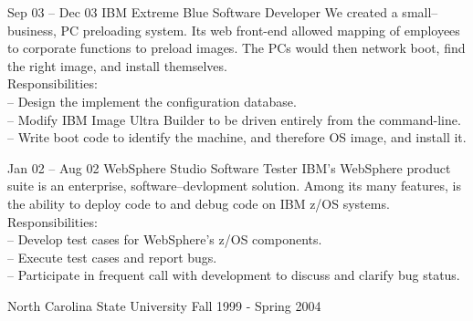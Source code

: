 \documentclass[a4paper, 10pt]{article}
\begin{document}
\begin{resume}
\begin{project}{Sep 03 -- Dec 03} {IBM Extreme Blue} {Software Developer}
            We created a small--business, PC preloading system.  Its web front-end allowed
            mapping of employees to corporate functions to preload images.  The PCs would
            then network boot, find the right image, and install themselves.
            \\[1ex]
            Responsibilities: \\
            -- Design the implement the configuration database. \\
            -- Modify IBM Image Ultra Builder to be driven entirely from the command-line. \\
            -- Write boot code to identify the machine, and therefore OS image, and install it.
        \end{project}
        \begin{project}{Jan 02 -- Aug 02} {WebSphere Studio} {Software Tester}
            IBM's WebSphere product suite is an enterprise, software--devlopment solution.  Among
            its many features, is the ability to deploy code to and debug code on IBM z/OS systems.
            \\[1ex]
            Responsibilities: \\
            -- Develop test cases for WebSphere's z/OS components. \\
            -- Execute test cases and report bugs. \\
            -- Participate in frequent call with development to discuss and clarify bug status.
       \end{project}
        \begin{education}
             {North Carolina State University}
                    { }                        {Fall 1999 - Spring 2004}
        \end{education}
    \end{resume}
\end{document}

